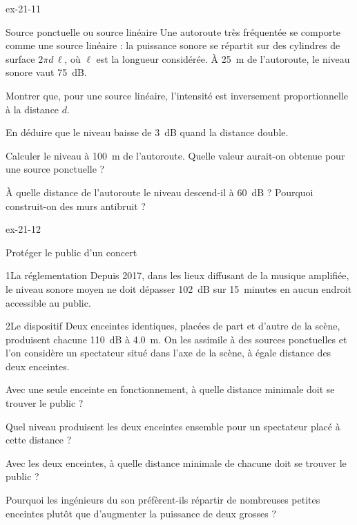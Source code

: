 \begin{blocLivre}{ex-21-11}
\begin{exercice}[2]{Source ponctuelle ou source linéaire}
Une autoroute très fréquentée se comporte comme une source linéaire : la puissance sonore se répartit sur des cylindres
de surface $2\pi d\,\ell$, où $\ell$ est la longueur considérée. À \qty{25}{m} de l'autoroute, le niveau sonore vaut
\qty{75}{dB}.
\begin{questions}
\item Montrer que, pour une source linéaire, l'intensité est inversement proportionnelle à la distance $d$.
\item En déduire que le niveau baisse de \qty{3}{dB} quand la distance double.
\item Calculer le niveau à \qty{100}{m} de l'autoroute. Quelle valeur aurait-on obtenue pour une source ponctuelle ?
\item À quelle distance de l'autoroute le niveau descend-il à \qty{60}{dB} ? Pourquoi construit-on des murs antibruit ?
\end{questions}
\end{exercice}
\end{blocLivre}
\begin{blocLivre}{ex-21-12}
\begin{exercice}[3]{Protéger le public d'un concert}
\begin{docu}{1}{La réglementation}
Depuis 2017, dans les lieux diffusant de la musique amplifiée, le niveau sonore moyen ne doit dépasser
\qty{102}{dB} sur 15~minutes en aucun endroit accessible au public.
\end{docu}
\begin{docu}{2}{Le dispositif}
Deux enceintes identiques, placées de part et d'autre de la scène, produisent chacune \qty{110}{dB} à \qty{4,0}{m}. On les
assimile à des sources ponctuelles et l'on considère un spectateur situé dans l'axe de la scène, à égale distance des
deux enceintes.
\end{docu}
\begin{questions}
\item Avec une seule enceinte en fonctionnement, à quelle distance minimale doit se trouver le public ?
\item Quel niveau produisent les deux enceintes ensemble pour un spectateur placé à cette distance ?
\item \initiative Avec les deux enceintes, à quelle distance minimale de chacune doit se trouver le public ?
\item Pourquoi les ingénieurs du son préfèrent-ils répartir de nombreuses petites enceintes plutôt que d'augmenter la
puissance de deux grosses ?
\end{questions}
\end{exercice}
\end{blocLivre}
